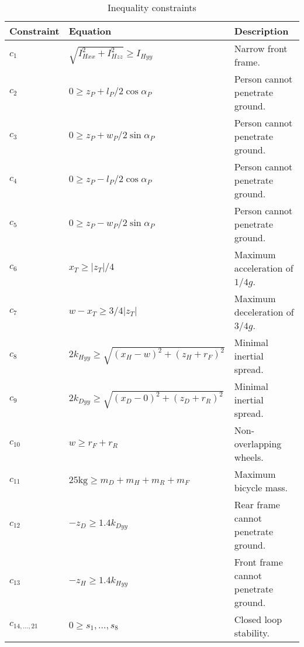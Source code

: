 \documentclass{bmd2019a}
\begin{document}
\begin{description}
\end{description}


\begin{table}
  \caption{Inequality constraints}
  \begin{tabular}{lll}
    \toprule
    Constraint & Equation & Description \\
    \midrule
    $c_1$    & $\sqrt{I_{Hxx}^2+I_{Hzz}^2} \geq I_{Hyy}$           & Narrow front frame. \\
    $c_2$    & $0 \geq z_P + l_P/2 \cos{\alpha_P}$                 & Person cannot penetrate ground. \\
    $c_3$    & $0 \geq z_P + w_P/2 \sin{\alpha_P}$                 & Person cannot penetrate ground. \\
    $c_4$    & $0 \geq z_P - l_P/2 \cos{\alpha_P}$                 & Person cannot penetrate ground. \\
    $c_5$    & $0 \geq z_P - w_P/2 \sin{\alpha_P}$                 & Person cannot penetrate ground. \\
    $c_6$    & $x_T \geq |z_T|/4$                                  & Maximum acceleration of $1/4g$. \\
    $c_7$    & $w-x_T \geq 3/4|z_T|$                               & Maximum deceleration of $3/4g$. \\
    $c_8$    & $2k_{Hyy} \geq \sqrt{(x_H - w)^2 + (z_H + r_F)^2}$  & Minimal inertial spread. \\
    $c_9$    & $2k_{Dyy} \geq \sqrt{(x_D - 0)^2 + (z_D + r_R)^2}$  & Minimal inertial spread. \\
    $c_{10}$ & $w \geq r_F +r_R$                                   & Non-overlapping wheels. \\
    $c_{11}$ & $25\si{\kg} \geq m_D + m_H + m_R + m_F$             & Maximum bicycle mass. \\
    $c_{12}$ & $-z_D \geq 1.4 k_{Dyy}$                             & Rear frame cannot penetrate ground. \\
    $c_{13}$ & $-z_H \geq 1.4 k_{Hyy}$                             & Front frame cannot penetrate ground. \\
    $c_{14,\ldots,21}$ & $0 \geq s_1,\ldots,s_8$                   & Closed loop stability. \\
    \bottomrule
  \end{tabular}
\end{table}
\end{document}
